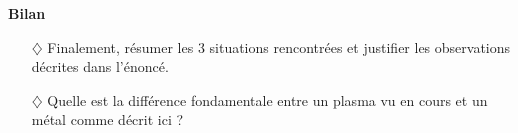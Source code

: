 \documentclass{report}
\begin{document}
\textbf{Bilan}

\begin{itemize}

	\item[$\diamondsuit$] Finalement, résumer les 3 situations rencontrées et justifier les observations décrites dans l'énoncé.

	\item[$\diamondsuit$] Quelle est la différence fondamentale entre un plasma vu en cours et un métal comme décrit ici ?

\end{itemize}
\end{document}
